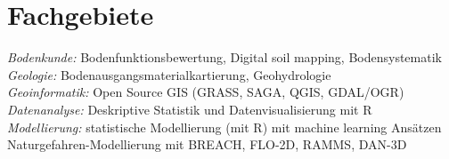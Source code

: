 \documentclass[a4paper]{twentysecondcv} %
\begin{document}

\aboutme{} %







\makeprofile %




\section{Fachgebiete}

\emph{Bodenkunde:} Bodenfunktionsbewertung, Digital soil mapping, Bodensystematik\\[0.3em]
\emph{Geologie:} Bodenausgangsmaterialkartierung, Geohydrologie\\[0.3em]
\emph{Geoinformatik:} Open Source GIS (GRASS, SAGA, QGIS, GDAL/OGR)\\[0.3em]
\emph{Datenanalyse:} Deskriptive Statistik und Datenvisualisierung mit R\\[0.3em]
\emph{Modellierung:} statistische Modellierung (mit R) mit machine learning Ans\"atzen\\
\hspace*{6em}           Naturgefahren-Modellierung mit BREACH, FLO-2D, RAMMS, DAN-3D\\
\end{document}
